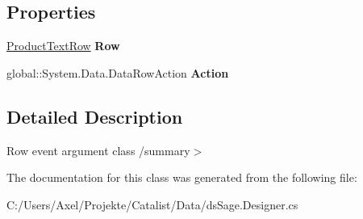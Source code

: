 \subsection*{Properties}
\begin{DoxyCompactItemize}
\item 
\hyperlink{class_products_1_1_data_1_1ds_sage_1_1_product_text_row}{Product\+Text\+Row} {\bfseries Row}\hypertarget{class_products_1_1_data_1_1ds_sage_1_1_product_text_row_change_event_ad2305527c810dce477718e2f1b5dd6cc}{}\label{class_products_1_1_data_1_1ds_sage_1_1_product_text_row_change_event_ad2305527c810dce477718e2f1b5dd6cc}

\item 
global\+::\+System.\+Data.\+Data\+Row\+Action {\bfseries Action}\hypertarget{class_products_1_1_data_1_1ds_sage_1_1_product_text_row_change_event_a711e929ebd2df70b9f229eb16c764214}{}\label{class_products_1_1_data_1_1ds_sage_1_1_product_text_row_change_event_a711e929ebd2df70b9f229eb16c764214}

\end{DoxyCompactItemize}


\subsection{Detailed Description}
Row event argument class /summary$>$ 

The documentation for this class was generated from the following file\+:\begin{DoxyCompactItemize}
\item 
C\+:/\+Users/\+Axel/\+Projekte/\+Catalist/\+Data/ds\+Sage.\+Designer.\+cs\end{DoxyCompactItemize}
